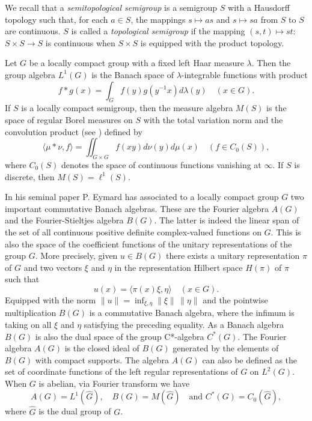 \documentclass{tran-l}
\numberwithin{equation}{section}
\theoremstyle{definition}
\theoremstyle{remark}
\begin{document}
We recall that a \emph{semitopological semigroup} is a semigroup $S$ with a Hausdorff topology such that, for each $a\in S$, the mappings $s\mapsto as$ and $s\mapsto sa$ from $S$ to $S$ are continuous. $S$ is called a \emph{topological semigroup} if the mapping $(s,t)\mapsto st$: $S\times S \to S$ is continuous when $S\times S$ is equipped with the product topology.

Let $G$ be a locally compact group with a fixed left Haar measure $\lambda$. Then the group algebra $L^1(G)$ is the Banach space of $\lambda$-integrable functions with product
\[
f*g(x) = \int_G{f(y)g(y^{-1}x)}d\lambda(y) \quad (x\in G).
\]
If $S$ is a locally compact semigroup, then the measure algebra $M(S)$ is the space of regular Borel measures on $S$ with the total variation norm and the convolution product (see \cite{HR}) defined by 
\[
{\langle}\mu*\nu, f{\rangle} = \iint_{G\times G}{f(xy)}d\nu(y)d\mu(x) \quad (f\in C_0(S)),
\]
where $C_0(S)$ denotes the space of continuous functions vanishing at $\infty$.
If $S$ is discrete, then $M(S)=\ell^1(S)$.

In his seminal paper \cite{Eymard} P. Eymard has associated to a locally compact group $G$ two important commutative Banach algebras. These are the Fourier algebra $A(G)$ and the Fourier-Stieltjes algebra $B(G)$. The latter is indeed the linear span of the set of all continuous positive definite complex-valued functions on $G$. This is also the space of the coefficient functions of the unitary representations of the group $G$. More precisely, given $u\in B(G)$ there exists a unitary representation $\pi$ of $G$ and two vectors $\xi$ and $\eta$ in the representation Hilbert space $H(\pi)$ of $\pi$ such that 
\[
u(x) = {\langle}\pi(x)\xi, \eta{\rangle} \quad (x\in G).
\]
Equipped with the norm $\|u\| = \inf_{\xi,\eta}\|\xi\|\,\|\eta\|$ and the pointwise multiplication $B(G)$ is a commutative Banach algebra, where the infimum is taking on all $\xi$ and $\eta$ satisfying the preceding equality. As a Banach algebra $B(G)$ is also the dual space of the group C*-algebra $C^*(G)$. The Fourier algebra $A(G)$ is the closed ideal of $B(G)$ generated by the elements of $B(G)$ with compact supports. The algebra $A(G)$ can also be defined as the set of coordinate functions of the left regular representations of $G$ on $L^2(G)$. When $G$ is abelian, via Fourier transform we have
\[
A(G) = L^1(\hat G), \quad B(G) = M(\hat G) \quad \text{and } C^*(G) = C_0(\hat G),
\]
where $\hat G$ is the dual group of $G$.
\end{document}
